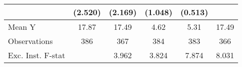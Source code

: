 {\begin{tabular}{l*{5}{c}}
            &     (2.520)         &     (2.169)         &     (1.048)         &     (0.513)         &                     \\
\midrule
Mean Y      &       17.87         &       17.49         &        4.62         &        5.31         &       17.49         \\
Observations&         386         &         367         &         384         &         383         &         366         \\
Exc. Inst. F-stat&                     &       3.962         &       3.824         &       7.874         &       8.031         \\
\bottomrule
\end{tabular}
}
